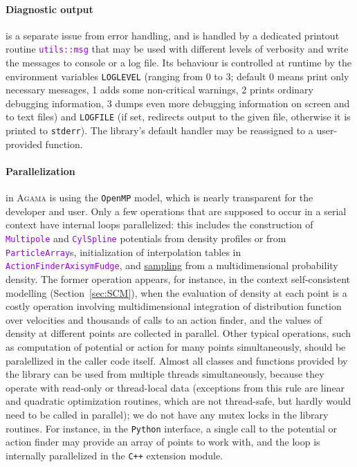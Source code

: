 \documentclass[12pt]{article}
\newcommand{\Agama}{\textsc{Agama}\xspace}
\newcommand{\Cpp}  {\texttt{C++}\xspace}
\newcommand{\Python}{\texttt{Python}\xspace}
\newcommand{\ttt}[1]{\textcolor{darkviolet}{\texttt{#1}}}
\begin{document}
\paragraph{Diagnostic output}  is a separate issue from error handling, and is handled by a dedicated printout routine \ttt{utils::msg} that may be used with different levels of verbosity and write the messages to console or a log file. Its behaviour is controlled at runtime by the environment variables \texttt{LOGLEVEL} (ranging from 0 to 3; default 0 means print only necessary messages, 1 adds some non-critical warnings, 2 prints ordinary debugging information, 3 dumps even more debugging information on screen and to text files) and \texttt{LOGFILE} (if set, redirects output to the given file, otherwise it is printed to \texttt{stderr}). The library's default handler may be reassigned to a user-provided function.

\paragraph{Parallelization}  in \Agama is using the \texttt{OpenMP} model, which is nearly transparent for the developer and user. Only a few operations that are supposed to occur in a serial context have internal loops parallelized: this includes the construction of \ttt{Multipole} and \ttt{CylSpline} potentials from density profiles or from \ttt{ParticleArray}s, initialization of interpolation tables in \ttt{ActionFinderAxisymFudge}, and \hyperref[sec:Sampling]{sampling} from a multidimensional probability density. The former operation appears, for instance, in the context self-consistent modelling (Section~\ref{sec:SCM}), when the evaluation of density at each point is a costly operation involving multidimensional integration of distribution function over velocities and thousands of calls to an action finder, and the values of density at different points are collected in parallel.
Other typical operations, such as computation of potential or action for many points simultaneously, should be paralellized in the caller code itself. Almost all classes and functions provided by the library can be used from multiple threads simultaneously, because they operate with read-only or thread-local data (exceptions from this rule are linear and quadratic optimization routines, which are not thread-safe, but hardly would need to be called in parallel); we do not have any mutex locks in the library routines.
For instance, in the \Python interface, a single call to the potential or action finder may provide an array of points to work with, and the loop is internally parallelized in the \Cpp extension module. 
\end{document}
